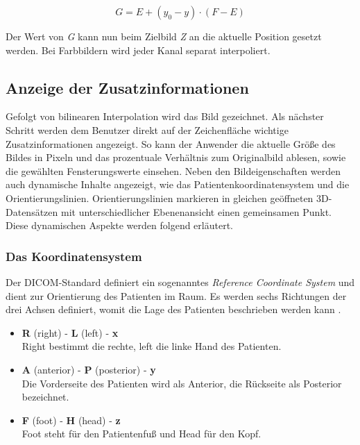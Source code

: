 \begin{equation}
G = E + (y_0 - y) \cdot (F-E)
\end{equation}

Der Wert von \textit{G} kann nun beim Zielbild \textit{Z} an die aktuelle Position gesetzt werden. Bei Farbbildern wird jeder Kanal separat interpoliert.

\FloatBarrier
\subsection{Anzeige der Zusatzinformationen}

Gefolgt von bilinearen Interpolation wird das Bild gezeichnet. Als nächster Schritt werden dem Benutzer direkt auf der Zeichenfläche wichtige Zusatzinformationen angezeigt. So kann der Anwender die aktuelle Größe des Bildes in Pixeln und das prozentuale Verhältnis zum Originalbild ablesen, sowie die gewählten Fensterungswerte einsehen. Neben den Bildeigenschaften werden auch dynamische Inhalte angezeigt, wie das Patientenkoordinatensystem und die Orientierungslinien. Orientierungslinien markieren in gleichen geöffneten 3D-Datensätzen mit unterschiedlicher Ebenenansicht einen gemeinsamen Punkt. Diese dynamischen Aspekte werden folgend erläutert.

\FloatBarrier
\subsubsection{Das Koordinatensystem}

Der DICOM-Standard definiert ein sogenanntes \textit{Reference Coordinate System} \cite[S. 55]{dicom:iod} und dient zur Orientierung des Patienten im Raum. Es werden sechs Richtungen der drei Achsen definiert, womit die Lage des Patienten beschrieben werden kann \cite[C.7.6.1.1.1]{dicom:iod}. 

\begin{itemize}
\item \textbf{R} (right) - \textbf{L} (left) - \textbf{x} \\
	Right bestimmt die rechte, left die linke Hand des Patienten.
\item \textbf{A} (anterior) - \textbf{P} (posterior) - \textbf{y} \\
   Die Vorderseite des Patienten wird als Anterior, die Rückseite als Posterior bezeichnet.
\item \textbf{F} (foot) - \textbf{H} (head) - \textbf{z} \\
 Foot steht für den Patientenfuß und Head für den Kopf.
\end{itemize}


